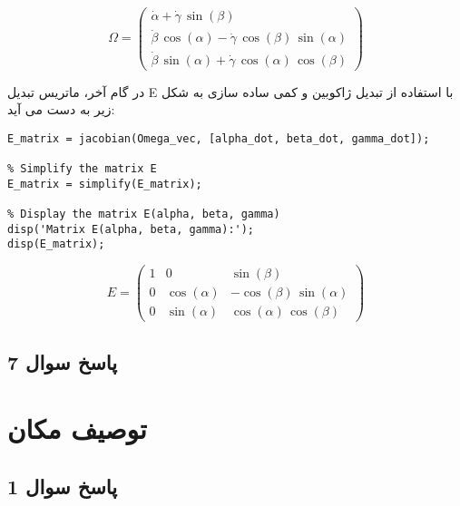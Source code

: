 \[
\Omega = \left(\begin{array}{c}
	\dot{\alpha} + \dot{\gamma} \,\sin \left(\beta \right) \\
	\dot{\beta} \,\cos \left(\alpha \right) - \dot{\gamma} \,\cos \left(\beta \right) \,\sin \left(\alpha \right) \\
	\dot{\beta} \,\sin \left(\alpha \right) + \dot{\gamma} \,\cos \left(\alpha \right) \,\cos \left(\beta \right)
\end{array}\right)
\]

در گام آخر، ماتریس تبدیل E با استفاده از تبدیل ژاکوبین و کمی ساده سازی به شکل زیر به دست می آید:

\begin{latin}
	\begin{lstlisting}[frame=single,style=Matlab-Pyglike]
% Construct the matrix E by taking the Jacobian of Omega with respect to [alpha_dot; beta_dot; gamma_dot]
E_matrix = jacobian(Omega_vec, [alpha_dot, beta_dot, gamma_dot]);

% Simplify the matrix E
E_matrix = simplify(E_matrix);

% Display the matrix E(alpha, beta, gamma)
disp('Matrix E(alpha, beta, gamma):');
disp(E_matrix);

	\end{lstlisting}
\end{latin}

\[
E = \left(\begin{array}{ccc}
	1 & 0 & \sin \left(\beta \right) \\
	0 & \cos \left(\alpha \right) & -\cos \left(\beta \right) \,\sin \left(\alpha \right) \\
	0 & \sin \left(\alpha \right) & \cos \left(\alpha \right) \,\cos \left(\beta \right)
\end{array}\right)
\]



\subsection{ پاسخ سوال 7}

\section{توصیف مکان}

\subsection{ پاسخ سوال 1}


